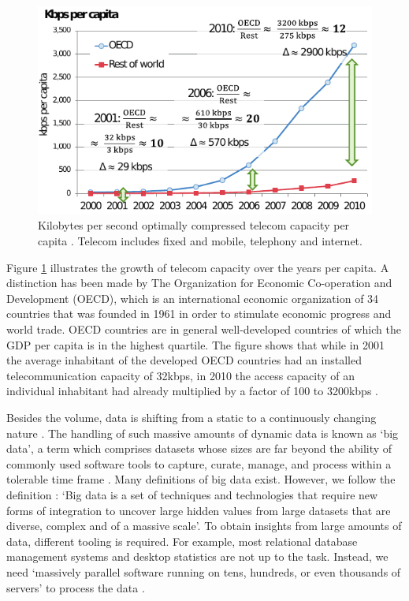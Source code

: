 \begin{figure}[ht!]
\centering
\includegraphics[width=\textwidth]{figures/kbpspercapita.pdf}
\caption[Telecom capacity per capita]{Kilobytes per second optimally compressed telecom capacity per capita \cite{SIGN:SIGN584}. Telecom includes fixed and mobile, telephony and internet. \label{fig:growth}}
\end{figure}

Figure \ref{fig:growth} illustrates the growth of telecom capacity over the years per capita. A distinction has been made by The Organization for Economic Co-operation and Development (OECD), which is an international economic organization of 34 countries that was founded in 1961 in order to stimulate economic progress and world trade. OECD countries are in general well-developed countries of which the GDP per capita is in the highest quartile. The figure shows that while in 2001 the average inhabitant of the developed OECD countries had an installed telecommunication capacity of 32kbps, in 2010 the access capacity of an individual inhabitant had already multiplied by a factor of 100 to 3200kbps \cite{SIGN:SIGN584}.

Besides the volume, data is shifting from a static to a continuously changing nature \cite{1558609016}. The handling of such massive amounts of dynamic data is known as `big data', a term which comprises datasets whose sizes are far beyond the ability of commonly used software tools to capture, curate, manage, and process within a tolerable time frame \cite{bigdata}. Many definitions of big data exist. However, we follow the definition \cite{Hashem201598}: `Big data is a set of techniques and technologies that require new forms of integration to uncover large hidden values from large datasets that are diverse, complex and of a massive scale'. To obtain insights from large amounts of data, different tooling is required. For example, most relational database management systems and desktop statistics are not up to the task. Instead, we need `massively parallel software running on tens, hundreds, or even thousands of servers' to process the data \cite{Jacobs:2009:PBD:1536616.1536632}.

